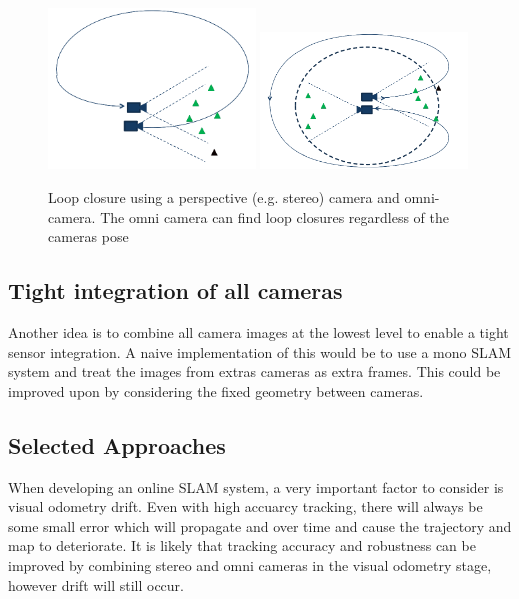 \begin{figure}[h!]
  \centering
    \includegraphics[width=0.49\textwidth]{chapters/images/stereo_loop}
    \includegraphics[width=0.49\textwidth]{chapters/images/omni_loop} 
    \caption{Loop closure using a perspective (e.g. stereo) camera and omni-camera.  The omni camera can find loop closures regardless of the cameras pose}
  \label{fig:omni_loop_close}
\end{figure}

\subsection{Tight integration of all cameras}

Another idea is to combine all camera images at the lowest level to enable a tight sensor integration.  A naive implementation of this would be to use a mono SLAM system and treat the images from extras cameras as extra frames.  This could be improved upon by considering the fixed geometry between cameras.

\subsection{Selected Approaches}
\label{subsec:selected_approach}

When developing an online SLAM system, a very important factor to consider is visual odometry drift.  Even with high accuarcy tracking, there will always be some small error which will propagate and over time and cause the trajectory and map to deteriorate. It is likely that tracking accuracy and robustness can be improved by combining stereo and omni cameras in the visual odometry stage, however drift will still occur.

